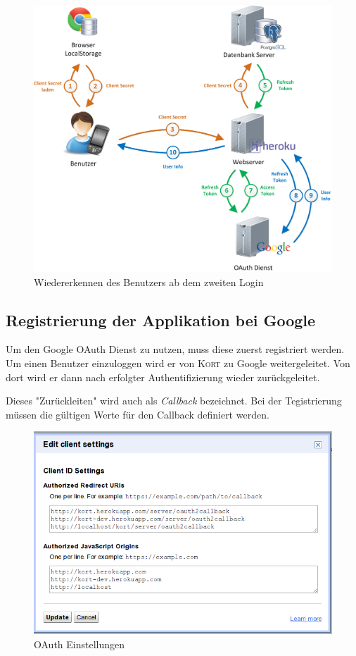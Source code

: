\begin{figure}[H]
	\centering
	\includegraphics[width=\textwidth]{images/implementation/backend/kort-relogin}
	\caption{Wiedererkennen des Benutzers ab dem zweiten Login}
	\label{image-kort-relogin}
\end{figure}

\subsection{Registrierung der Applikation bei Google}
Um den Google OAuth Dienst zu nutzen, muss diese zuerst registriert werden.
Um einen Benutzer einzuloggen wird er von \textsc{Kort} zu Google weitergeleitet.
Von dort wird er dann nach erfolgter Authentifizierung wieder zurückgeleitet.

Dieses "Zurückleiten" wird auch als \emph{Callback} bezeichnet.
Bei der Tegistrierung müssen die gültigen Werte für den Callback definiert werden.

\begin{figure}[H]
	\centering
	\includegraphics[scale=0.5]{images/implementation/backend/oauth-google-settings}
	\caption{OAuth Einstellungen}
\end{figure}